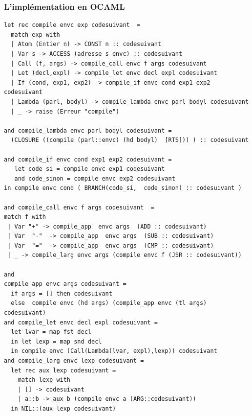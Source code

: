\documentclass[11pt]{book}
\begin{document}
\subsubsection{L'implémentation en OCAML}

\begin{footnotesize}
\begin{Verbatim}
let rec compile envc exp codesuivant  =
  match exp with
  | Atom (Entier n) -> CONST n :: codesuivant
  | Var s -> ACCESS (adresse s envc) :: codesuivant
  | Call (f, args) -> compile_call envc f args codesuivant
  | Let (decl,expl) -> compile_let envc decl expl codesuivant 
  | If (cond, exp1, exp2) -> compile_if envc cond exp1 exp2 codesuivant
  | Lambda (parl, bodyl) -> compile_lambda envc parl bodyl codesuivant
  | _ -> raise (Erreur "compile")

and compile_lambda envc parl bodyl codesuivant =
  (CLOSURE ((compile (parl::envc) (hd bodyl)  [RTS])) ) :: codesuivant 

and compile_if envc cond exp1 exp2 codesuivant =
   let code_si = compile envc exp1 codesuivant
   and code_sinon = compile envc exp2 codesuivant
in compile envc cond ( BRANCH(code_si,  code_sinon) :: codesuivant ) 

and compile_call envc f args codesuivant  =
match f with 
 | Var "+" -> compile_app  envc args  (ADD :: codesuivant)
 | Var  "-"  -> compile_app  envc args  (SUB :: codesuivant)
 | Var  "="  -> compile_app  envc args  (CMP :: codesuivant)
 | _ -> compile_larg envc args (compile envc f (JSR :: codesuivant))
 
and
compile_app envc args codesuivant =
  if args = [] then codesuivant
  else  compile envc (hd args) (compile_app envc (tl args) codesuivant) 
and compile_let envc decl expl codesuivant =
  let lvar = map fst decl
  in let lexp = map snd decl
  in compile envc (Call(Lambda(lvar, expl),lexp)) codesuivant 
and compile_larg envc lexp codesuivant =
  let rec aux lexp codesuivant =
    match lexp with
    | [] -> codesuivant
    | a::b -> aux b (compile envc a (ARG::codesuivant))
  in NIL::(aux lexp codesuivant)
    

\end{Verbatim}
\end{footnotesize}
\end{document}
